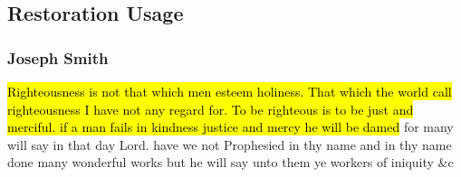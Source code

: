 
\subsection{Restoration Usage} %
	\label{RIGHTEOUSNESS-RESTORATION}

	\subsubsection{Joseph Smith} %
		\label{RIGHTEOUSNESS-JS}
	
		\begin{compactdesc}
			\item[{\hyperlink{EMS-1843-JS-21-MAY-1843-HC-c}{21 May 1843 HC-c}}] \hl{Righteousness is not that which men esteem holiness. That which the world call righteousness I have not any regard for. To be righteous is to be just and merciful. if a man fails in kindness justice and mercy he will be damed} for many will say in that day Lord. have we not Prophesied in thy name and in thy name done many wonderful works but he will say unto them ye workers of iniquity \&c
		\end{compactdesc}
		
	
	
	
	
